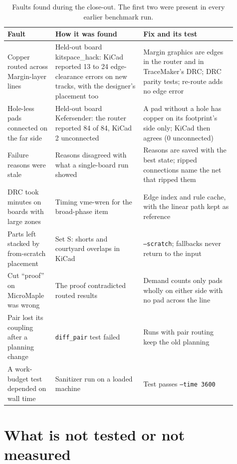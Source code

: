\documentclass[10pt,a4paper]{article}
\newcommand{\code}[1]{\texttt{#1}}
\begin{document}
\begin{table}[H]
\centering\small
\begin{tabular}{@{}p{0.19\linewidth}p{0.35\linewidth}p{0.37\linewidth}@{}}
\toprule
Fault & How it was found & Fix and its test \\
\midrule
Copper routed across Margin-layer lines & Held-out board kitspace\_hack: KiCad reported 13 to 24 edge-clearance errors on new tracks, with the designer's placement too & Margin graphics are edges in the router and in TraceMaker's DRC; DRC parity tests; re-route adds no edge error \\
Hole-less pads connected on the far side & Held-out board Kefersender: the router reported 84 of 84, KiCad 2 unconnected & A pad without a hole has copper on its footprint's side only; KiCad then agrees (0 unconnected) \\
Failure reasons were stale & Reasons disagreed with what a single-board run showed & Reasons are saved with the best state; ripped connections name the net that ripped them \\
DRC took minutes on boards with large zones & Timing vme-wren for the broad-phase item & Edge index and rule cache, with the linear path kept as reference \\
Parts left stacked by from-scratch placement & Set S: shorts and courtyard overlaps in KiCad & \code{--scratch}; fallbacks never return to the input \\
Cut ``proof'' on MicroMaple was wrong & The proof contradicted routed results & Demand counts only pads wholly on either side with no pad across the line \\
Pair lost its coupling after a planning change & \code{diff\_pair} test failed & Runs with pair routing keep the old planning \\
A work-budget test depended on wall time & Sanitizer run on a loaded machine & Test passes \code{--time 3600} \\
\bottomrule
\end{tabular}
\caption{Faults found during the close-out. The first two were present in every earlier benchmark run.}
\end{table}

\section{What is not tested or not measured}
\end{document}
